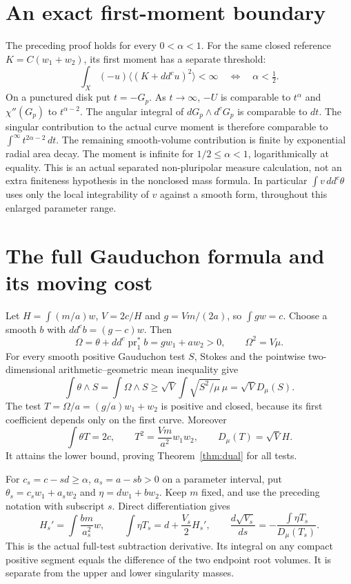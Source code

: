 \documentclass[11pt]{article}
\newcommand{\ddc}{dd^c}
\begin{document}
\section{An exact first-moment boundary}
The preceding proof holds for every $0<\alpha<1$. For the same closed
reference $K=C(w_1+w_2)$, its first moment has a separate threshold:
\[
 \int_X(-u)\langle (K+\ddc u)^2\rangle<\infty
       \quad\Longleftrightarrow\quad\alpha<\tfrac12.
\]
On a punctured disk put $t=-G_p$. As $t\to\infty$, $-U$ is comparable
to $t^\alpha$ and $\chi''(G_p)$ to $t^{\alpha-2}$.
The angular integral of $dG_p\wedge d^cG_p$ is comparable to $dt$.
The singular contribution to the actual curve moment is therefore
comparable to $\int^\infty t^{2\alpha-2}\,dt$.
The remaining smooth-volume contribution is finite by exponential radial
area decay. The moment is infinite for $1/2\leq\alpha<1$, logarithmically
at equality. This is an actual separated non-pluripolar measure calculation,
not an extra finiteness hypothesis in the nonclosed mass formula.
In particular $\int v\,\ddc\theta$ uses only the local integrability
of $v$ against a smooth form, throughout this enlarged parameter range.

\section{The full Gauduchon formula and its moving cost}
Let $H=\int(m/a)w$, $V=2c/H$ and $g=Vm/(2a)$, so $\int gw=c$.
Choose a smooth $b$ with $\ddc b=(g-c)w$. Then
\[
 \Omega=\theta+\ddc\operatorname{pr}_1^*b=gw_1+aw_2>0,
 \qquad\Omega^2=V\mu.
\]
For every smooth positive Gauduchon test $S$, Stokes and the pointwise
two-dimensional arithmetic--geometric mean inequality give
\[
 \int\theta\wedge S=\int\Omega\wedge S
       \geq\sqrt V\int\sqrt{S^2/\mu}\,\mu=\sqrt V D_\mu(S).
\]
The test $T=\Omega/a=(g/a)w_1+w_2$ is positive and closed, because its
first coefficient depends only on the first curve. Moreover
\[
 \int\theta T=2c,\qquad T^2=\frac{Vm}{a^2}w_1w_2,
 \qquad D_\mu(T)=\sqrt V H.
\]
It attains the lower bound, proving Theorem~\ref{thm:dual} for all tests.

For $c_s=c-sd\geq\alpha$, $a_s=a-sb>0$ on a parameter interval, put
$\theta_s=c_sw_1+a_sw_2$ and $\eta=dw_1+bw_2$. Keep $m$ fixed, and
use the preceding notation with subscript $s$. Direct differentiation gives
\[
 H_s'=\int\frac{bm}{a_s^2}w,\qquad
 \int\eta T_s=d+\frac{V_s}{2}H_s',\qquad
 \frac{d\sqrt{V_s}}{ds}
       =-\frac{\int\eta T_s}{D_\mu(T_s)}.
\]
This is the actual full-test subtraction derivative. Its integral on any
compact positive segment equals the difference of the two endpoint root
volumes. It is separate from the upper and lower singularity masses.
\end{document}
